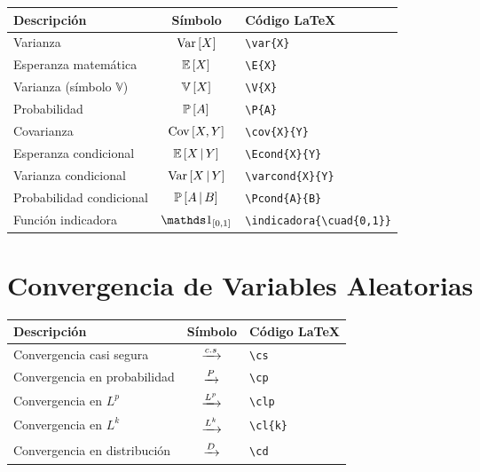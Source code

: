 \documentclass{article}
\renewcommand{\arraystretch}{1.75}
\begin{document}
\renewcommand{\arraystretch}{1.8}
\begin{tabularx}{\textwidth}{@{}l c X@{}}
    \toprule
        Descripción & Símbolo                               & Código \LaTeX \\
    \midrule
        Varianza                                & $\var{X}$                     & \texttt{\textbackslash var\{X\}} \\
        Esperanza matemática                    & $\E{X}$                       & \texttt{\textbackslash E\{X\}} \\
        Varianza (símbolo $\mathbb{V}$)         & $\V{X}$                       & \texttt{\textbackslash V\{X\}} \\
        Probabilidad                            & $\P{A}$                       & \texttt{\textbackslash P\{A\}} \\
        Covarianza                              & $\cov{X}{Y}$                  & \texttt{\textbackslash cov\{X\}\{Y\}} \\
        Esperanza condicional                   & $\Econd{X}{Y}$                & \texttt{\textbackslash Econd\{X\}\{Y\}} \\
        Varianza condicional                    & $\varcond{X}{Y}$              & \texttt{\textbackslash varcond\{X\}\{Y\}} \\
        Probabilidad condicional                 & $\Pcond{A}{B}$                 & \texttt{\textbackslash Pcond\{A\}\{B\}} \\
        Función indicadora                      & $\indicadora{\cuad{0,1}}$              & \texttt{\textbackslash indicadora\{\textbackslash cuad\{0,1\}\}} \\
    \bottomrule
\end{tabularx}

\section{Convergencia de Variables Aleatorias}

\renewcommand{\arraystretch}{1.8}
\begin{tabularx}{\textwidth}{@{}l c X@{}}
    \toprule
        Descripción & Símbolo         & Código \LaTeX \\
    \midrule
        Convergencia casi segura       & $\cs$       & \texttt{\textbackslash cs} \\
        Convergencia en probabilidad   & $\cp$       & \texttt{\textbackslash cp} \\
        Convergencia en $L^p$          & $\clp$      & \texttt{\textbackslash clp} \\
        Convergencia en $L^{k}$        & $\cl{k}$    & \texttt{\textbackslash cl\{k\}} \\
        Convergencia en distribución   & $\cd$       & \texttt{\textbackslash cd} \\
    \bottomrule
\end{tabularx}
\end{document}
